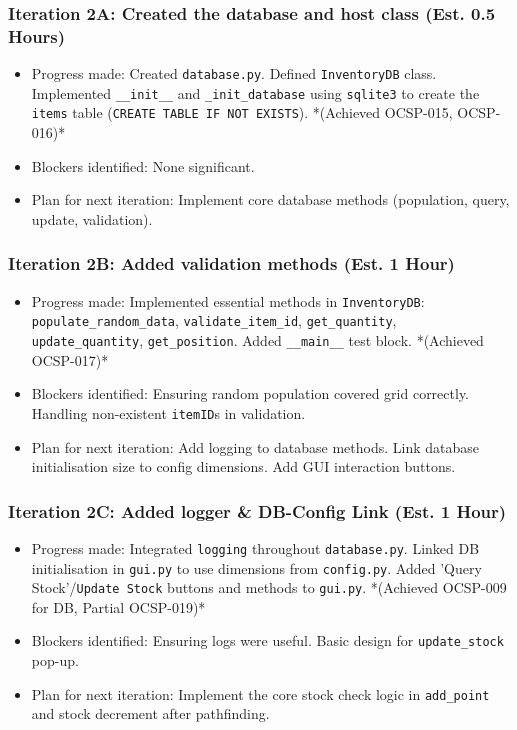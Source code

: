 \subsubsection{Iteration 2A: Created the database and host class (Est. 0.5 Hours)}
\begin{itemize}
	\item Progress made: Created \verb|database.py|. Defined \verb|InventoryDB| class. Implemented \verb|__init__| and \verb|_init_database| using \verb|sqlite3| to create the \verb|items| table (\verb|CREATE TABLE IF NOT EXISTS|). *(Achieved OCSP-015, OCSP-016)*
	\item Blockers identified: None significant.
	\item Plan for next iteration: Implement core database methods (population, query, update, validation).
\end{itemize}

\subsubsection{Iteration 2B: Added validation methods (Est. 1 Hour)}
\begin{itemize}
	\item Progress made: Implemented essential methods in \verb|InventoryDB|: \verb|populate_random_data|, \verb|validate_item_id|, \verb|get_quantity|, \verb|update_quantity|, \verb|get_position|. Added \verb|__main__| test block. *(Achieved OCSP-017)*
	\item Blockers identified: Ensuring random population covered grid correctly. Handling non-existent \verb|itemID|s in validation.
	\item Plan for next iteration: Add logging to database methods. Link database initialisation size to config dimensions. Add GUI interaction buttons.
\end{itemize}

\subsubsection{Iteration 2C: Added logger \& DB-Config Link (Est. 1 Hour)}
\begin{itemize}
	\item Progress made: Integrated \verb|logging| throughout \verb|database.py|. Linked DB initialisation in \verb|gui.py| to use dimensions from \verb|config.py|. Added 'Query Stock'/\verb|Update Stock| buttons and methods to \verb|gui.py|. *(Achieved OCSP-009 for DB, Partial OCSP-019)*
	\item Blockers identified: Ensuring logs were useful. Basic design for \verb|update_stock| pop-up.
	\item Plan for next iteration: Implement the core stock check logic in \verb|add_point| and stock decrement after pathfinding.
\end{itemize}

